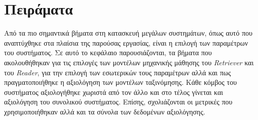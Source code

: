 \chapter{Πειράματα}
\label{chapter:experiments}
Από τα πιο σημαντικά βήματα στη κατασκευή μεγάλων συστημάτων, όπως αυτό που αναπτύχθηκε στα πλαίσια της παρούσας εργασίας, είναι η επιλογή των παραμέτρων του συστήματος. Σε αυτό το κεφάλαιο παρουσιάζονται, τα βήματα που ακολουθήθηκαν για τις επιλογές των μοντέλων μηχανικής μάθησης του \emph{Retriever} και του \emph{Reader}, για την επιλογή των εσωτερικών τους παραμέτρων αλλά και πως πραγματοποιήθηκε η αξιολόγηση των μοντέλων ταξινόμησης. Κάθε κόμβος του συστήματος αξιολογήθηκε χωριστά από τον άλλο και στο τέλος γίνεται και αξιολόγηση του συνολικού συστήματος. Επίσης, σχολιάζονται οι μετρικές που χρησιμοποιήθηκαν αλλά και τα σύνολα των δεδομένων αξιολόγησης.









